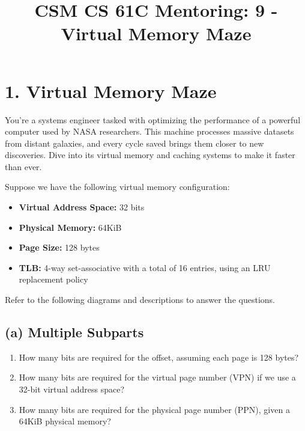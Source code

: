 \documentclass{article}
\title{CSM CS 61C Mentoring: 9 - Virtual Memory Maze}
\author{}
\date{}
\begin{document}
\maketitle

\section*{1. Virtual Memory Maze}

You’re a systems engineer tasked with optimizing the performance of a powerful computer used by NASA researchers. This machine processes massive datasets from distant galaxies, and every cycle saved brings them closer to new discoveries. Dive into its virtual memory and caching systems to make it faster than ever.

Suppose we have the following virtual memory configuration:
\begin{itemize}
    \item \textbf{Virtual Address Space:} 32 bits
    \item \textbf{Physical Memory:} 64KiB
    \item \textbf{Page Size:} 128 bytes
    \item \textbf{TLB:} 4-way set-associative with a total of 16 entries, using an LRU replacement policy
\end{itemize}
Refer to the following diagrams and descriptions to answer the questions.

\subsection*{(a) Multiple Subparts}

\begin{enumerate}[label=\arabic*.]
    \item How many bits are required for the offset, assuming each page is 128 bytes? \\[0.3cm]

    \item How many bits are required for the virtual page number (VPN) if we use a 32-bit virtual address space? \\[0.3cm]

    \item How many bits are required for the physical page number (PPN), given a 64KiB physical memory? \\[0.2cm]
\end{enumerate}

\vspace{0.4cm}
\end{document}
